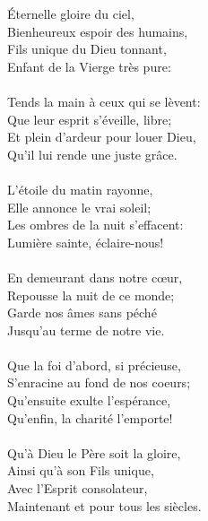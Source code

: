 Éternelle gloire du ciel,\\
Bienheureux espoir des humains,\\
Fils unique du Dieu tonnant,\\
Enfant de la Vierge très pure:\\
\\
Tends la main à ceux qui se lèvent:\\
Que leur esprit s’éveille, libre;\\
Et plein d’ardeur pour louer Dieu,\\
Qu’il lui rende une juste grâce.\\
\\
L’étoile du matin rayonne,\\
Elle annonce le vrai soleil;\\
Les ombres de la nuit s’effacent:\\
Lumière sainte, éclaire-nous!\\
\\
En demeurant dans notre cœur,\\
Repousse la nuit de ce monde;\\
Garde nos âmes sans péché\\
Jusqu’au terme de notre vie.\\
\\
Que la foi d’abord, si précieuse,\\
S’enracine au fond de nos coeurs;\\
Qu’ensuite exulte l’espérance,\\
Qu’enfin, la charité l’emporte!\\
\\
Qu'à Dieu le Père soit la gloire,\\
Ainsi qu'à son Fils unique,\\
Avec l'Esprit consolateur,\\
Maintenant et pour tous les siècles.